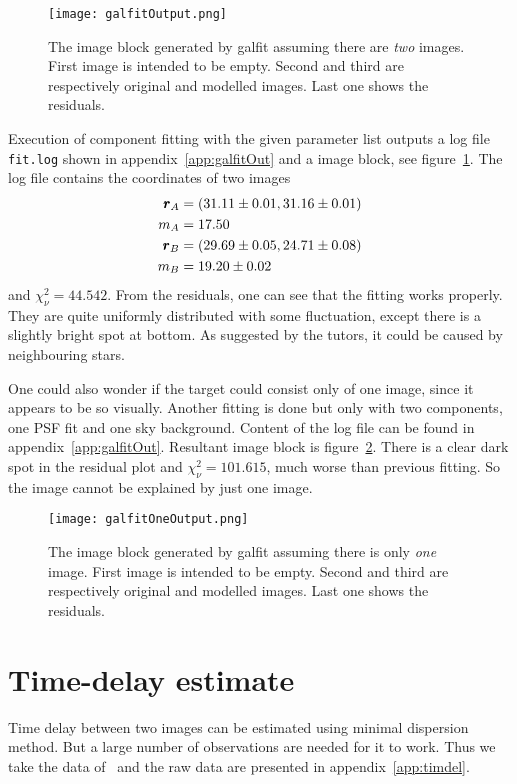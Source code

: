 \begin{figure}[ht]
	\centering
	\texttt{[image: galfitOutput.png]}
	\caption{The image block generated by galfit assuming there are \textit{two} images. First image is intended to be empty. Second and third are respectively original and modelled images. Last one shows the residuals.}%
	\label{fig:galfitOut}
\end{figure}
Execution of component fitting with the given parameter list outputs a log file \verb|fit.log| shown in appendix~\ref{app:galfitOut} and a image block, see figure~\ref{fig:galfitOut}. The log file contains the coordinates of two images
\begin{align}
	\begin{split}
	\pmb{r}_A &= (\num{31.11 +- 0.01}, \num{31.16 +- 0.01}) \\
	m_A &= \num{17.50 +- 0.00} \\
	\pmb{r}_B &= (\num{29.69 +- 0.05}, \num{24.71 +- 0.08}) \\
	m_B &= \num{19.20 +- 0.02}
	\end{split}\label{math:galfitResult}
\end{align}
and $\chi^2_\nu = \num{44.542}$. From the residuals, one can see that the fitting works properly. They are quite uniformly distributed with some fluctuation, except there is a slightly bright spot at bottom. As suggested by the tutors, it could be caused by neighbouring stars. 

One could also wonder if the target could consist only of one image, since it appears to be so visually. Another fitting is done but only with two components, one PSF fit and one sky background. Content of the log file can be found in appendix~\ref{app:galfitOut}. Resultant image block is figure~\ref{fig:galfitOneOut}. There is a clear dark spot in the residual plot and $\chi^2_\nu = 101.615$, much worse than previous fitting. So the image cannot be explained by just one image.
\begin{figure}[ht]
	\centering
	\texttt{[image: galfitOneOutput.png]}
	\caption{The image block generated by galfit assuming there is only \textit{one} image. First image is intended to be empty. Second and third are respectively original and modelled images. Last one shows the residuals.}%
	\label{fig:galfitOneOut}
\end{figure}

\clearpage
\section{Time-delay estimate} 
Time delay between two images can be estimated using minimal dispersion method. But a large number of observations are needed for it to work. Thus we take the data of~\cite{vuissoz} and the raw data are presented in appendix~\ref{app:timdel}.

